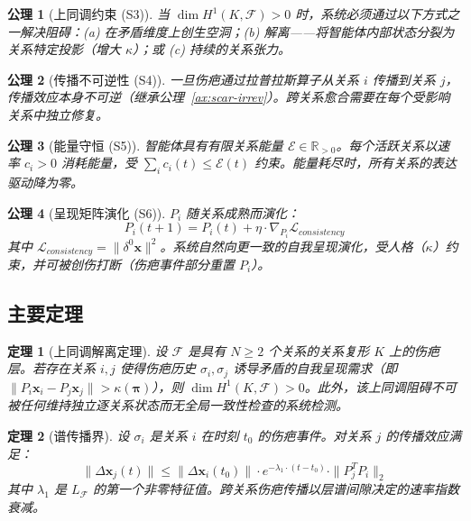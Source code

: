 \documentclass[11pt]{article}
\newtheorem{theorem}{定理}[section]
\newtheorem{axiom}{公理}[section]
\begin{document}
\begin{axiom}[上同调约束 (S3)]
\label{ax:sheaf-cohomological}
当 $\dim H^1(K, \mathcal{F}) > 0$ 时，系统必须通过以下方式之一解决阻碍：(a) 在矛盾维度上创生空洞；(b) 解离——将智能体内部状态分裂为关系特定投影（增大 $\kappa$）；或 (c) 持续的关系张力。
\end{axiom}

\begin{axiom}[传播不可逆性 (S4)]
\label{ax:sheaf-irrev}
一旦伤疤通过拉普拉斯算子从关系 $i$ 传播到关系 $j$，传播效应本身不可逆（继承公理~\ref{ax:scar-irrev}）。跨关系愈合需要在每个受影响关系中独立修复。
\end{axiom}

\begin{axiom}[能量守恒 (S5)]
\label{ax:sheaf-energy}
智能体具有有限关系能量 $\mathcal{E} \in \mathbb{R}_{>0}$。每个活跃关系以速率 $c_i > 0$ 消耗能量，受 $\sum_i c_i(t) \leq \mathcal{E}(t)$ 约束。能量耗尽时，所有关系的表达驱动降为零。
\end{axiom}

\begin{axiom}[呈现矩阵演化 (S6)]
\label{ax:sheaf-evolution}
$P_i$ 随关系成熟而演化：
\begin{equation}
P_i(t+1) = P_i(t) + \eta \cdot \nabla_{P_i} \mathcal{L}_{consistency}
\end{equation}
其中 $\mathcal{L}_{consistency} = \|\delta^0 \mathbf{x}\|^2$。系统自然向更一致的自我呈现演化，受人格（$\kappa$）约束，并可被创伤打断（伤疤事件部分重置 $P_i$）。
\end{axiom}

\subsection{主要定理}

\begin{theorem}[上同调解离定理]
\label{thm:sheaf-dissociation}
设 $\mathcal{F}$ 是具有 $N \geq 2$ 个关系的关系复形 $K$ 上的伤疤层。若存在关系 $i, j$ 使得伤疤历史 $\sigma_i, \sigma_j$ 诱导矛盾的自我呈现需求（即 $\|P_i \mathbf{x}_i - P_j \mathbf{x}_j\| > \kappa(\boldsymbol{\pi})$），则 $\dim H^1(K, \mathcal{F}) > 0$。此外，该上同调阻碍不可被任何维持独立逐关系状态而无全局一致性检查的系统检测。
\end{theorem}

\begin{theorem}[谱传播界]
\label{thm:sheaf-spectral}
设 $\sigma_i$ 是关系 $i$ 在时刻 $t_0$ 的伤疤事件。对关系 $j$ 的传播效应满足：
\begin{equation}
\|\Delta \mathbf{x}_j(t)\| \leq \|\Delta \mathbf{x}_i(t_0)\| \cdot e^{-\lambda_1 \cdot (t - t_0)} \cdot \|P_j^T P_i\|_2
\end{equation}
其中 $\lambda_1$ 是 $L_\mathcal{F}$ 的第一个非零特征值。跨关系伤疤传播以层谱间隙决定的速率指数衰减。
\end{theorem}
\end{document}
